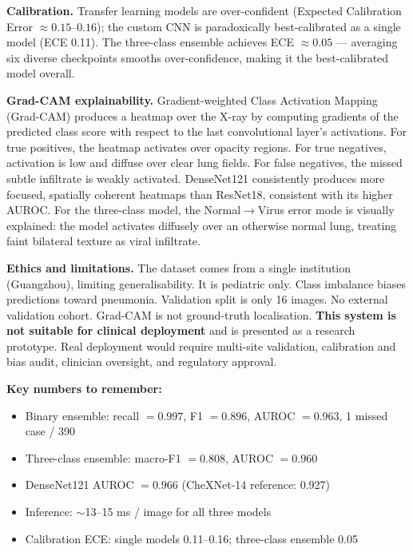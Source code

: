 \documentclass[12pt,a4paper]{article}
\begin{document}
\begin{tcolorbox}[sumbox={What This Project Is About — A Complete Overview}]
\medskip
\textbf{Calibration.}
Transfer learning models are over-confident (Expected Calibration Error $\approx 0.15$--$0.16$); the custom CNN is paradoxically best-calibrated as a single model (ECE 0.11). The three-class ensemble achieves ECE $\approx 0.05$ --- averaging six diverse checkpoints smooths over-confidence, making it the best-calibrated model overall.

\medskip
\textbf{Grad-CAM explainability.}
Gradient-weighted Class Activation Mapping (Grad-CAM) produces a heatmap over the X-ray by computing gradients of the predicted class score with respect to the last convolutional layer's activations. For true positives, the heatmap activates over opacity regions. For true negatives, activation is low and diffuse over clear lung fields. For false negatives, the missed subtle infiltrate is weakly activated. DenseNet121 consistently produces more focused, spatially coherent heatmaps than ResNet18, consistent with its higher AUROC. For the three-class model, the Normal$\to$Virus error mode is visually explained: the model activates diffusely over an otherwise normal lung, treating faint bilateral texture as viral infiltrate.

\medskip
\textbf{Ethics and limitations.}
The dataset comes from a single institution (Guangzhou), limiting generalisability. It is pediatric only. Class imbalance biases predictions toward pneumonia. Validation split is only 16 images. No external validation cohort. Grad-CAM is not ground-truth localisation. \textbf{This system is not suitable for clinical deployment} and is presented as a research prototype. Real deployment would require multi-site validation, calibration and bias audit, clinician oversight, and regulatory approval.

\medskip
\textbf{Key numbers to remember:}
\begin{itemize}[nosep]
  \item Binary ensemble: recall $= 0.997$, F1 $= 0.896$, AUROC $= 0.963$, 1 missed case / 390
  \item Three-class ensemble: macro-F1 $= 0.808$, AUROC $= 0.960$
  \item DenseNet121 AUROC $= 0.966$ (CheXNet-14 reference: 0.927)
  \item Inference: $\sim$13--15 ms / image for all three models
  \item Calibration ECE: single models 0.11--0.16; three-class ensemble 0.05
\end{itemize}
\end{tcolorbox}
\end{document}
